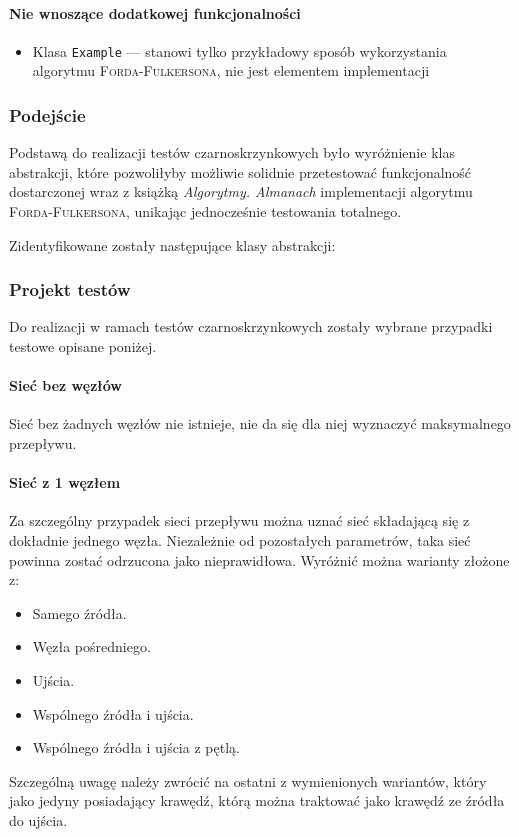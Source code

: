 \begin{itemize}[nosep]
\paragraph{Nie wnoszące dodatkowej funkcjonalności}
\begin{itemize}[nosep]
    \item Klasa \texttt{Example} --- stanowi tylko przykładowy sposób wykorzystania algorytmu \textsc{Forda-Fulkersona}, nie jest elementem implementacji%
\end{itemize}

\subsubsection{Podejście}%
Podstawą do realizacji testów czarno\dywiz skrzynkowych było wyróżnienie klas abstrakcji, które pozwoliłyby możliwie solidnie przetestować funkcjonalność dostarczonej wraz z książką \emph{Algorytmy. Almanach} implementacji algorytmu \textsc{Forda-Fulkersona}, unikając jednocześnie testowania totalnego.

Zidentyfikowane zostały następujące klasy abstrakcji:



\subsubsection{Projekt testów}
Do realizacji w ramach testów czarnoskrzynkowych zostały wybrane przypadki testowe opisane poniżej.

\paragraph{Sieć bez węzłów}
Sieć bez żadnych węzłów nie istnieje, nie da się dla niej wyznaczyć maksymalnego
przepływu.

\paragraph{Sieć z 1 węzłem}
Za szczególny przypadek sieci przepływu można uznać sieć składającą się z
dokładnie jednego węzła. Niezależnie od pozostałych parametrów, taka sieć
powinna zostać odrzucona jako nieprawidłowa. Wyróżnić można warianty złożone z:
\begin{itemize}[nosep]
    \item Samego źródła.
    \item Węzła pośredniego.
    \item Ujścia.
    \item Wspólnego źródła i ujścia.
    \item Wspólnego źródła i ujścia z pętlą.
\end{itemize}
Szczególną uwagę należy zwrócić na ostatni z wymienionych wariantów, który jako
jedyny posiadający krawędź, którą można traktować jako krawędź ze źródła do
ujścia.


\end{itemize}
